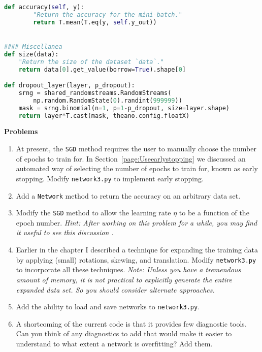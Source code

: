 \begin{fullwidth}
\begin{lstlisting}[caption={network3.py (Python 2.7)},label={lst:network3.py}, language=Python]
    def accuracy(self, y):
        "Return the accuracy for the mini-batch."
        return T.mean(T.eq(y, self.y_out))


#### Miscellanea
def size(data):
    "Return the size of the dataset `data`."
    return data[0].get_value(borrow=True).shape[0]

def dropout_layer(layer, p_dropout):
    srng = shared_randomstreams.RandomStreams(
        np.random.RandomState(0).randint(999999))
    mask = srng.binomial(n=1, p=1-p_dropout, size=layer.shape)
    return layer*T.cast(mask, theano.config.floatX)
\end{lstlisting}
\end{fullwidth}

\textbf{Problems}
\begin{enumerate}
\item 
At present, the \lstinline{SGD} method requires the user to manually choose the number of epochs to train for. In Section~\ref{page:Useearlystopping}  we discussed an automated way of selecting the number of epochs to train for, known as early stopping. Modify \lstinline{network3.py} to implement early stopping.

\item 
Add a \lstinline{Network} method to return the accuracy on an arbitrary data set.

\item 
Modify the \lstinline{SGD} method to allow the learning rate $\eta$  to be a function of the epoch number. \textit{Hint: After working on this problem for a while, you may find it useful to see this discussion \cite{theanolearnrate2019}.}

\item 
Earlier in the chapter I described a technique for expanding the training data by applying (small) rotations, skewing, and translation. Modify \lstinline{network3.py} to incorporate all these techniques. \textit{Note: Unless you have a tremendous amount of memory, it is not practical to explicitly generate the entire expanded data set. So you should consider alternate approaches.}

\item 
Add the ability to load and save networks to \lstinline{network3.py}.

\item 
A shortcoming of the current code is that it provides few diagnostic tools. Can you think of any diagnostics to add that would make it easier to understand to what extent a network is overfitting? Add them.


\end{enumerate}
